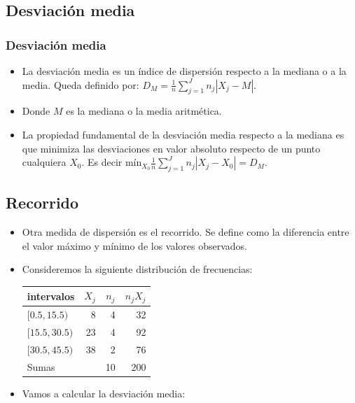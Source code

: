 \subsection{Desviación media}

\begin{frame}
\frametitle{Desviación media}
\begin{itemize}
\item La desviación media es un índice de dispersión respecto a la mediana o a la media. Queda
definido por: $D_M=\frac{1}{n}\sum\limits_{j=1}^{J}n_j|X_j - M|.$
\item Donde $M$ es la mediana o la media aritmética.
\item La propiedad fundamental de la desviación  media respecto a la mediana es que minimiza
las desviaciones en valor absoluto respecto de un punto cualquiera $X_0$. Es decir $\mbox{mín}_{X_0} \frac{1}{n} \sum\limits_{j=1}^{J}n_j|X_j - X_0|=D_M.$
\end{itemize}
\end{frame}

\subsection{Recorrido}
\begin{frame}
\begin{itemize}
\item Otra medida de dispersión es el recorrido. Se define como la diferencia entre el valor
máximo y mínimo de los valores observados.
\item Consideremos la siguiente distribución de frecuencias:
\begin{center}
\begin{tabular}{lrrr}
intervalos &\multicolumn{1}{c}{$X_j$} & \multicolumn{1}{c}{$n_j$}
&\multicolumn{1}{c}{$n_j X_j$}\\ \hline $[0.5,15.5) $ &  8 & 4  & 32  \\ $[15.5,30.5)$ &
23 & 4 & 92 \\ $[30.5,45.5)$ & 38 & 2 & 76 \\
 \hline
Sumas     &      & 10 & 200
\end{tabular}
\end{center}
\item  Vamos a calcular la desviación media:
\end{itemize}
\end{frame}

